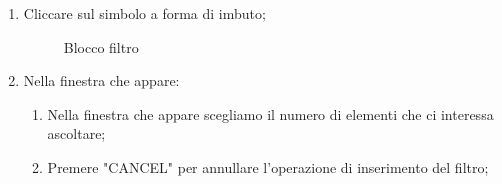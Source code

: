 \begin{enumerate}
	\item Cliccare sul simbolo a forma di imbuto;
	\begin{figure}[!ht]
		\centering
		\caption{Blocco filtro}
	\end{figure}
	\item Nella finestra che appare:
	\begin{enumerate}
		\item Nella finestra che appare scegliamo il numero di elementi che ci interessa ascoltare;
		\item Premere "CANCEL" per annullare l'operazione di inserimento del filtro;

\end{enumerate}
\end{enumerate}

